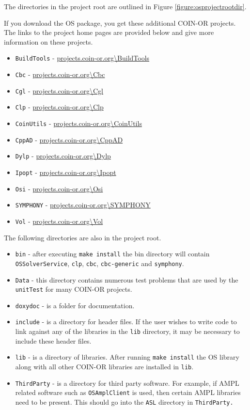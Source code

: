 \documentclass[11pt]{article}
\newcounter{Fig}
\renewcommand{\_}{{\char"5F}}
\renewcommand{\{}{{\char"7B}}
\renewcommand{\}}{{\char"7D}}
\renewcommand{\^}{{\char"0D}}
\renewcommand{\'}{{\char"0D}}
\begin{document}
The directories in the  project root  are outlined in Figure  \ref{figure:osprojectrootdir}.

If you download the OS package, you get these additional COIN-OR projects. The links to the project home pages are provided below and give more information on these projects.
\begin{itemize}
\item {\tt BuildTools} - \url{projects.coin-or.org\BuildTools}
\item {\tt Cbc} - \url{projects.coin-or.org\Cbc}
\item {\tt Cgl} - \url{projects.coin-or.org\Cgl}
\item {\tt Clp}  - \url{projects.coin-or.org\Clp}
\item {\tt CoinUtils} - \url{projects.coin-or.org\CoinUtils}
\item {\tt CppAD} - \url{projects.coin-or.org\CppAD}
\item {\tt Dylp} - \url{projects.coin-or.org\Dylp}
\item {\tt Ipopt} - \url{projects.coin-or.org\Ipopt}
\item {\tt Osi} - \url{projects.coin-or.org\Osi}
\item {\tt SYMPHONY}   - \url{projects.coin-or.org\SYMPHONY}
\item {\tt Vol}   - \url{projects.coin-or.org\Vol}
\end{itemize}

The following directories are also in the project root.
\begin{itemize}
\item {\tt bin} - after executing {\tt make install} the bin directory will contain {\tt OSSolverService}, {\tt clp}, {\tt cbc},  {\tt cbc-generic} and {\tt symphony}.

\item {\tt Data} - this directory contains numerous test problems that are used by  the {\tt unitTest} for many  COIN-OR projects.

\item {\tt doxydoc} - is a folder for documentation.

\item {\tt include} - is a directory for header files. If the user wishes to write code to link against any of the libraries in the {\tt lib} directory, it may be necessary to include these header files.

\item {\tt lib} - is a directory of libraries. After running {\tt make install} the OS library along with all other COIN-OR libraries are installed in {\tt lib}.

\item {\tt ThirdParty} - is a  directory for third party software. For example, if AMPL related software  such as {\tt OSAmplClient} is used, then certain AMPL libraries need to be present. This should go into the {\tt ASL} directory in {\tt ThirdParty.}
\end{itemize}
\end{document}
